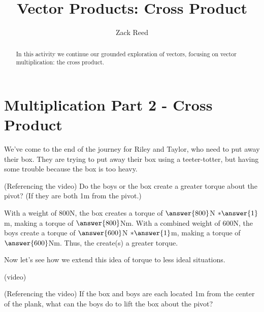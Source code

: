 \documentclass{ximera}
\title{Vector Products: Cross Product}
\author{Zack Reed}
\begin{document}
\begin{abstract}
In this activity we continue our grounded exploration of vectors, focusing on vector multiplication: the cross product.
\end{abstract}
\maketitle

\section{Multiplication Part 2 - Cross Product}

We've come to the end of the journey for Riley and Taylor, who need to put away their box. They are trying to put away their box using a teeter-totter, but having some trouble because the box is too heavy. 
\begin{center}
\end{center}

\begin{problem}
    (Referencing the video) Do the boys or the box create a greater torque about the pivot? (If they are both 1m from the pivot.)

    With a weight of $800$N, the box creates a torque of $\answer{800}$N $*\answer{1}$m, making a torque of $\answer{800}$Nm. With a combined weight of $600$N, the boys create a torque of $\answer{600}$N $*\answer{1}$m, making a torque of $\answer{600}$Nm. Thus, the  create(s) a greater torque.
\end{problem}

Now let's see how we extend this idea of torque to less ideal situations.

(video)

\begin{problem}
    (Referencing the video) If the box and boys are each located 1m from the center of the plank, what can the boys do to lift the box about the pivot?

    \begin{selectAll}
    \end{selectAll}
\end{problem}
\end{document}
